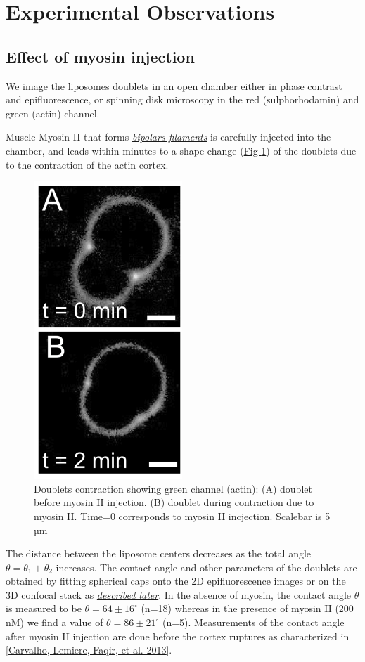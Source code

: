 \documentclass[A4paperpaper,11pt,english]{sphinxmanual}
\begin{document}
\section{Experimental Observations}
\label{parts/part4:experimental-observations}

\subsection{Effect of myosin injection}
\label{parts/part4:effect-of-myosin-injection}
We image the liposomes doublets in an open chamber either in phase contrast
and epifluorescence, or spinning disk microscopy in the red (sulphorhodamin)
and green (actin) channel.

Muscle Myosin II that forms {\hyperref[parts/part1:myoii]{\emph{bipolars filaments}}} is carefully injected into
the chamber, and leads within minutes to a shape change (\hyperref[parts/part4:doublets-contraction]{Fig  \ref*{parts/part4:doublets-contraction}})
of the doublets due to the contraction of the actin cortex.
\begin{figure}[htbp]
\centering
\capstart

\includegraphics[width=0.300\linewidth]{doublet-contract.png}
\caption{Doublets contraction showing green channel (actin): (A) doublet before
myosin II injection. (B) doublet during contraction due to myosin II. Time=0 corresponds to myosin II incjection.
Scalebar is 5 µm}\label{parts/part4:doublets-contraction}\end{figure}

The distance between the liposome centers decreases as the total angle \(\theta
= \theta_1+\theta_2\) increases. The contact angle and other parameters of the
doublets are obtained by fitting spherical caps onto the 2D epifluorescence
images or on the 3D confocal stack as {\hyperref[parts/part4:full3dfit]{\emph{described later}}}.  In the absence of myosin, the
contact angle \(\theta\) is measured to be \(\theta = 64 \pm 16 ^{\circ}\) (n=18) whereas in
the presence of myosin II (200 nM) we find a value of \(\theta = 86 \pm 21
^{\circ}\) (n=5). Measurements of the contact angle after myosin II injection are done before the cortex
ruptures as characterized in {\hyperref[parts/part4:carvalho2013a]{{[}Carvalho, Lemiere, Faqir,  et al.  2013{]}}}.
\end{document}
